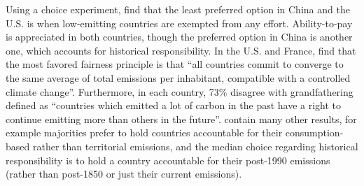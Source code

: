 Using a choice experiment, \citet{carlsson_fair_2013} find that the least preferred option in China and the U.S. is when low-emitting countries are exempted from any effort. Ability-to-pay is appreciated in both countries, though the preferred option in China is another one, which accounts for historical responsibility. %
In the U.S. and France, \citet{meilland_international_2023} find that the most favored fairness principle is that ``all countries commit to converge to the same average of total emissions per inhabitant, compatible with a controlled climate change''. Furthermore, in each country, 73\% disagree with grandfathering defined as ``countries which emitted a lot of carbon in the past have a right to continue emitting more than others in the future''. \citet{meilland_international_2023} contain many other results, for example majorities prefer to hold countries accountable for their consumption-based rather than territorial emissions, and the median choice regarding historical responsibility is to hold a country accountable for their post-1990 emissions (rather than post-1850 or just their current emissions). 
